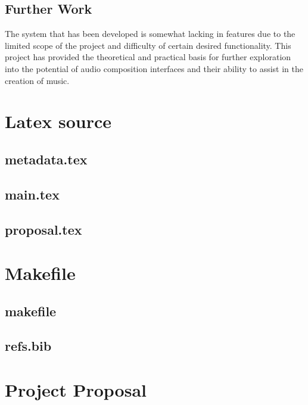 \documentclass[12pt,a4paper,twoside,openright]{report}
\begin{document}
\section{Further Work}
The system that has been developed is somewhat lacking in features due to the limited scope of the project and difficulty of certain desired functionality. This project has provided the theoretical and practical basis for further exploration into the potential of audio composition interfaces and their ability to assist in the creation of music.



\appendix

\chapter{Latex source}

\section{metadata.tex}
{\scriptsize}

\section{main.tex}
{\scriptsize}

\section{proposal.tex}
{\scriptsize}

\chapter{Makefile}

\section{makefile}\label{makefile}
{\scriptsize}

\section{refs.bib}
{\scriptsize}


\chapter{Project Proposal}


\end{document}
